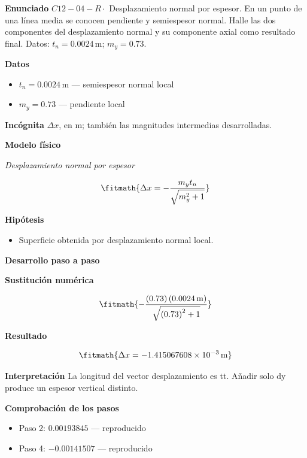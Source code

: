 \documentclass[10pt,openany]{book}
\begin{document}
\begin{tcolorbox}[title={Problema resuelto 4}, studiumworked, breakable]

\noindent\textbf{Enunciado}
\(C12-04-R \cdot\) Desplazamiento normal por espesor. En un punto de una línea media se conocen pendiente y semiespesor normal. Halle las dos componentes del desplazamiento normal y su componente axial como resultado final. Datos: \(t_n=0.0024\, \mathrm{m}\); \(m_y=0.73\).

\noindent\textbf{Datos}
\begin{itemize}
\item $t_n = 0.0024\,\mathrm{m}$ — semiespesor normal local
\item $m_y = 0.73$ — pendiente local
\end{itemize}

\noindent\textbf{Incógnita}
$\Delta x$, en $\mathrm{m}$; también las magnitudes intermedias desarrolladas.

\noindent\textbf{Modelo físico}

\noindent\textit{Desplazamiento normal por espesor}

\[
\fitmath{\Delta x=- \frac{m_y t_n}{\sqrt{m_y^{2} + 1}}}
\]

\noindent\textbf{Hipótesis}
\begin{itemize}
\item Superficie obtenida por desplazamiento normal local.
\end{itemize}

\noindent\textbf{Desarrollo paso a paso}



\noindent\textbf{Sustitución numérica}

\[
\fitmath{- \frac{\left(0.73\right) \left(0.0024\,\mathrm{m}\right)}{\sqrt{\left(0.73\right)^{2} + 1}}}
\]

\noindent\textbf{Resultado}

\[
\fitmath{\Delta x=-1.415067608\times10^{-3}\,\mathrm{m}}
\]

\noindent\textbf{Interpretación}
La longitud del vector desplazamiento es tt. Añadir solo dy produce un espesor vertical distinto.

\noindent\textbf{Comprobación de los pasos}
\begin{itemize}
\item Paso 2: $0.00193845$ — reproducido
\item Paso 4: $-0.00141507$ — reproducido
\end{itemize}


\end{tcolorbox}
\end{document}
